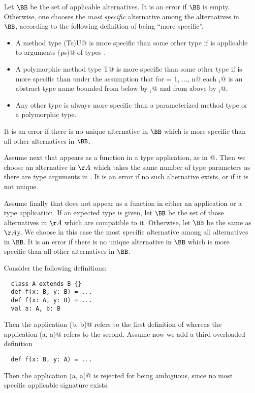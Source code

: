 \documentclass[11pt]{report}
\begin{document}
Let $\BB$ be the set of applicable alternatives. It is an error if
$\BB$ is empty. Otherwise, one chooses the {\em most specific}
alternative among the alternatives in $\BB$, according to the
following definition of being ``more specific''.
\begin{itemize} 
\item
A method type \verb@(Ts)U@ is more specific than some other
type \verb@S@ if \verb@S@ is applicable to arguments \verb@(ps)@ of
types \verb@Ts@.
\item
A polymorphic method type
\verb@[a$_1$ >: L$_1$ <: U$_1$, ..., a$_n$ >: L$_n$ <: U$_n$]T@ is
more specific than some other type \verb@S@ if \verb@T@ is more
specific than \verb@S@ under the assumption that for
\verb@i = 1, ..., n@ each \verb@a$_i$@ is an abstract type name
bounded from below by \verb@L$_i$@ and from above by \verb@U$_i$@.
\item
Any other type is always more specific than a parameterized method
type or a polymorphic type.
\end{itemize}
It is an error if there is no unique alternative in $\BB$ which is
more specific than all other alternatives in $\BB$.

Assume next that \verb@f@ appears as a function in a type
application, as in \verb@f[targs]@. Then we choose an alternative in
$\AA$ which takes the same number of type parameters as there are
type arguments in \verb@targs@. It is an error if no such alternative
exists, or if it is not unique.

Assume finally that \verb@f@ does not appear as a function in either
an application or a type application. If an expected type is given,
let $\BB$ be the set of those alternatives in $\AA$ which are
compatible to it. Otherwise, let $\BB$ be the same as $\AA$y.
We choose in this case the most specific alternative among all
alternatives in $\BB$. It is an error if there is no unique
alternative in $\BB$ which is more specific than all other
alternatives in $\BB$.

\example Consider the following definitions:

\begin{verbatim}
  class A extends B {}
  def f(x: B, y: B) = ...
  def f(x: A, y: B) = ...
  val a: A, b: B
\end{verbatim}
Then the application \verb@f(b, b)@ refers to the first
definition of \verb@f@ whereas the application \verb@f(a, a)@
refers to the second.  Assume now we add a third overloaded definition
\begin{verbatim}
  def f(x: B, y: A) = ...
\end{verbatim}
Then the application \verb@f(a, a)@ is rejected for being ambiguous, since
no most specific applicable signature exists.
\end{document}
